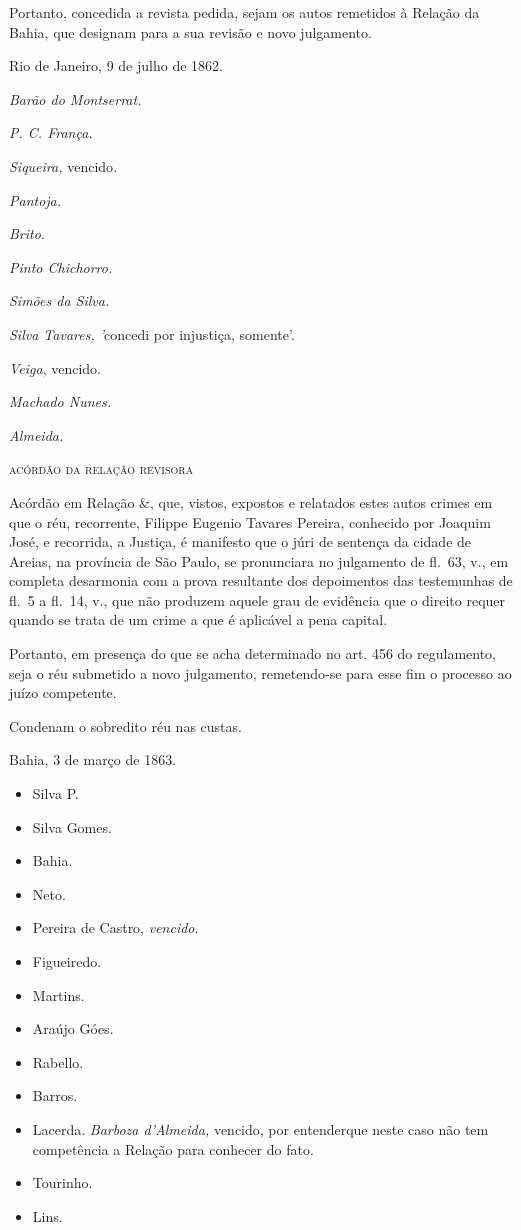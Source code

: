 Portanto, concedida a revista pedida, sejam os autos remetidos à Relação
da Bahia, que designam para a sua revisão e novo julgamento.

Rio de Janeiro, 9 de julho de 1862.

\emph{Barão do Montserrat.}

\emph{P. C. França.}

\emph{Siqueira,} vencido\emph{.}

\emph{Pantoja.}

\emph{Brito.}

\emph{Pinto Chichorro.}

\emph{Simões da Silva.}

\emph{Silva Tavares, '}concedi por injustiça, somente'.

\emph{Veiga}, vencido.

\emph{Machado Nunes.}

\emph{Almeida.}

\textsc{acórdão da relação revisora}

Acórdão em Relação \&, que, vistos, expostos e relatados estes autos
crimes em que o réu, recorrente, Filippe Eugenio Tavares Pereira,
conhecido por Joaquim José, e recorrida, a Justiça, é manifesto que o
júri de sentença da cidade de Areias, na província de São Paulo, se
pronunciara no julgamento de fl.~63, v., em completa desarmonia com a
prova resultante dos depoimentos das testemunhas de fl.~5 a fl.~14, v.,
que não produzem aquele grau de evidência que o direito requer quando se
trata de um crime a que é aplicável a pena capital.

Portanto, em presença do que se acha determinado no art. 456 do
regulamento, seja o réu submetido a novo julgamento, remetendo-se para
esse fim o processo ao juízo competente.

Condenam o sobredito réu nas custas.

Bahia, 3 de março de 1863.

\begin{itemize}
\tightlist
\item
  Silva P.
\item
  Silva Gomes.
\item
  Bahia.
\item
  Neto.
\item
  Pereira de Castro, \emph{vencido}.
\item
  Figueiredo.
\item
  Martins.
\item
  Araújo Góes.
\item
  Rabello.
\item
  Barros.
\item
  Lacerda. \emph{Barboza d'Almeida,} vencido, por entenderque neste caso
  não tem competência a Relação para conhecer do fato.
\item
  Tourinho.
\item
  Lins.
\end{itemize}

